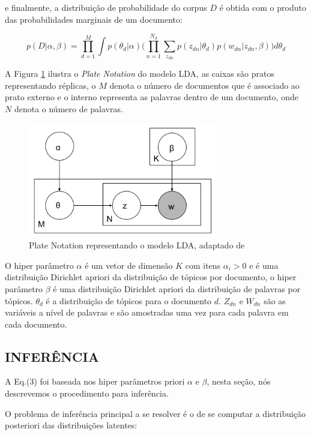 \documentclass[12pt,a4paper]{article}
\begin{document}
  e finalmente, a distribuição de probabilidade do corpus $D$ é obtida com o produto das probabilidades marginais de um documento:
  
  \begin{equation}
  p(D|\alpha,\beta)= \prod_{d=1}^{M} \int{p(\theta _d|\alpha)\Bigg(\prod_{n=1}^{N_d}\sum_{z_{dn}} p(z_{dn}|\theta _d)p(w_{dn}|z_{dn},\beta)\Bigg)d\theta _d}
  \end{equation}
  
  
  A Figura \ref{fig-plate} ilustra o 	\textit{Plate Notation} do modelo LDA, as caixas são pratos representando réplicas,
  o $M$ denota o número de documentos que é associado ao prato externo e o interno representa as palavras dentro de um documento, onde $N$ denota o número de palavras.
  
  \begin{figure}[H]
   \centering
     \includegraphics[height=5cm]{images/figure_1.png}
     \caption{Plate Notation representando o modelo LDA, adaptado de }
     \label{fig-plate}
  \end{figure}
  
  O hiper parâmetro $\alpha$ é um vetor de dimensão $K$ com itens \(\alpha _i>0\) e é uma distribuição Dirichlet apriori da distribuição de tópicos por documento,
  o hiper parâmetro $\beta$ é uma distribuição Dirichlet apriori da distribuição de palavras por tópicos. $\theta _d$ é a distribuição de tópicos para o documento $d$. $Z_{dn}$ e $W_{dn}$ são as variáveis a nível de palavras e são amostradas uma vez para cada palavra em cada documento.
  
  
  \subsection{INFERÊNCIA}
  A Eq.(3) foi baseada nos hiper parâmetros priori $\alpha$ e $\beta$, nesta seção, nós descrevemos o procedimento para inferência.
  
  O problema de inferência principal a se resolver é o de se computar a distribuição posteriori das distribuições latentes:
  
\end{document}
